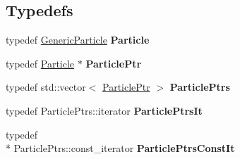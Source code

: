 \subsection*{Typedefs}
\begin{DoxyCompactItemize}
\item 
\hypertarget{namespace_h_a_l_a8e90b3570f12960529bfa31c5f4975ee}{typedef \hyperlink{class_h_a_l_1_1_generic_particle}{Generic\-Particle} {\bfseries Particle}}\label{namespace_h_a_l_a8e90b3570f12960529bfa31c5f4975ee}

\item 
\hypertarget{namespace_h_a_l_af40898da7d6a44a415de9012b3764210}{typedef \hyperlink{class_h_a_l_1_1_generic_particle}{Particle} $\ast$ {\bfseries Particle\-Ptr}}\label{namespace_h_a_l_af40898da7d6a44a415de9012b3764210}

\item 
\hypertarget{namespace_h_a_l_a775ef811d38552a0ee603d80b77da9ab}{typedef std\-::vector$<$ \hyperlink{class_h_a_l_1_1_generic_particle}{Particle\-Ptr} $>$ {\bfseries Particle\-Ptrs}}\label{namespace_h_a_l_a775ef811d38552a0ee603d80b77da9ab}

\item 
\hypertarget{namespace_h_a_l_acea038eb6c89dbf396060ed07b79059e}{typedef Particle\-Ptrs\-::iterator {\bfseries Particle\-Ptrs\-It}}\label{namespace_h_a_l_acea038eb6c89dbf396060ed07b79059e}

\item 
\hypertarget{namespace_h_a_l_a86a0d42ec6c4857f7f83138fe1dff490}{typedef \\*
Particle\-Ptrs\-::const\-\_\-iterator {\bfseries Particle\-Ptrs\-Const\-It}}\label{namespace_h_a_l_a86a0d42ec6c4857f7f83138fe1dff490}

\end{DoxyCompactItemize}
